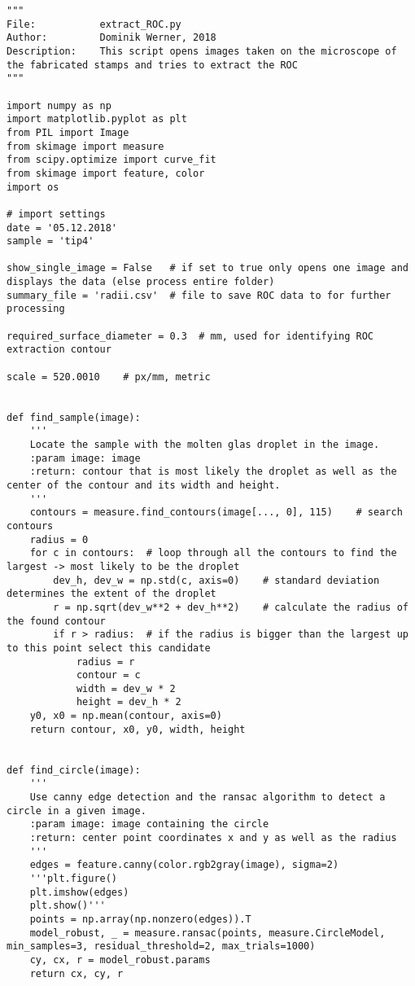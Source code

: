 \begin{lstlisting}
"""
File:           extract_ROC.py
Author:         Dominik Werner, 2018
Description:    This script opens images taken on the microscope of the fabricated stamps and tries to extract the ROC
"""

import numpy as np
import matplotlib.pyplot as plt
from PIL import Image
from skimage import measure
from scipy.optimize import curve_fit
from skimage import feature, color
import os

# import settings
date = '05.12.2018'
sample = 'tip4'

show_single_image = False   # if set to true only opens one image and displays the data (else process entire folder)
summary_file = 'radii.csv'  # file to save ROC data to for further processing

required_surface_diameter = 0.3  # mm, used for identifying ROC extraction contour

scale = 520.0010    # px/mm, metric


def find_sample(image):
    '''
    Locate the sample with the molten glas droplet in the image.
    :param image: image
    :return: contour that is most likely the droplet as well as the center of the contour and its width and height.
    '''
    contours = measure.find_contours(image[..., 0], 115)    # search contours
    radius = 0
    for c in contours:  # loop through all the contours to find the largest -> most likely to be the droplet
        dev_h, dev_w = np.std(c, axis=0)    # standard deviation determines the extent of the droplet
        r = np.sqrt(dev_w**2 + dev_h**2)    # calculate the radius of the found contour
        if r > radius:  # if the radius is bigger than the largest up to this point select this candidate
            radius = r
            contour = c
            width = dev_w * 2
            height = dev_h * 2
    y0, x0 = np.mean(contour, axis=0)
    return contour, x0, y0, width, height


def find_circle(image):
    '''
    Use canny edge detection and the ransac algorithm to detect a circle in a given image.
    :param image: image containing the circle
    :return: center point coordinates x and y as well as the radius
    '''
    edges = feature.canny(color.rgb2gray(image), sigma=2)
    '''plt.figure()
    plt.imshow(edges)
    plt.show()'''
    points = np.array(np.nonzero(edges)).T
    model_robust, _ = measure.ransac(points, measure.CircleModel, min_samples=3, residual_threshold=2, max_trials=1000)
    cy, cx, r = model_robust.params
    return cx, cy, r



\end{lstlisting}
